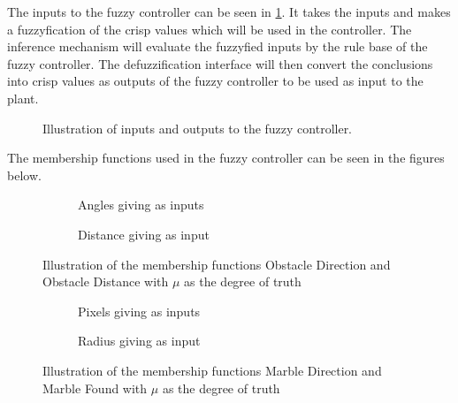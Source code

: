 \documentclass[../Head/Main.tex]{subfiles}
\begin{document}
The inputs to the fuzzy controller can be seen in \ref{fig:MSF_Overview}. It takes the inputs and makes a fuzzyfication of the crisp values which will be used in the controller. The inference mechanism will evaluate the fuzzyfied inputs by the rule base of the fuzzy controller. The defuzzification interface will then convert the conclusions into crisp values as outputs of the fuzzy controller to be used as input to the plant. 

\begin{figure}[H]
	\centering
	
	\caption{Illustration of inputs and outputs to the fuzzy controller.}
	\label{fig:MSF_Overview}
\end{figure}

The membership functions used in the fuzzy controller can be seen in the figures below.

\begin{figure}[H]
	\centering
	\begin{subfigure}[b]{0.49\textwidth}
		\centering
		
		\caption{Angles giving as inputs}
		\label{fig:MSF_Obstacle_direction}
	\end{subfigure}
	\hfill
	\begin{subfigure}[b]{0.49\textwidth}
		
		\vspace{-17pt}
		\caption{Distance giving as input}
		\label{fig:MSF_Obstacle_distance}
	\end{subfigure}
	\caption{Illustration of the membership functions Obstacle Direction and Obstacle Distance with $\mu$ as the degree of truth}
	\label{fig:MSF_Obstacle_dir_dis}
\end{figure}

\begin{figure}[H]
	\centering
	\begin{subfigure}[b]{0.49\textwidth}
		\centering
		
		\caption{Pixels giving as inputs }
		\label{fig:MSF_Marble_direction}
	\end{subfigure}
	\hfill
	\begin{subfigure}[b]{0.49\textwidth}
		
		\caption{Radius giving as input}
		\label{fig:MSF_Marble_found}
	\end{subfigure}
	\caption{Illustration of the membership functions Marble Direction and Marble Found with $\mu$ as the degree of truth}
	\label{fig:MSF_Marble}
\end{figure}
\end{document}
